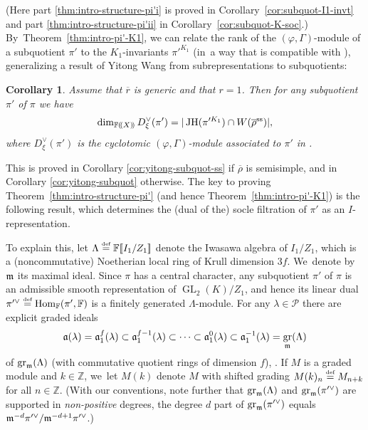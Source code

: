 \documentclass[JEP,XML,SOM,Unicode,NoFloatCountersInSection, NoEqCountersInSection,published]{cedram}
\newcommand{\defeq}{\stackrel{\textrm{\tiny{\upshape{def}}}}{=}}
\newcommand{\F}{\mathbb{F}}
\newcommand{\Z}{{\mathbb Z}}
\renewcommand{\P}{\mathscr P}
\renewcommand{\ss}{\mathrm{ss}}
\newcommand{\fa}{\mathfrak{a}}
\newcommand{\rbar}{\overline{r}}
\newcommand{\rhobar}{\overline{\rho}}
\newcommand{\brho}{\overline{\rho}}
\newcommand{\ppar}[1]{(\mkern-3mu(#1)\mkern-3mu)}
\newcommand{\bbra}[1]{[\mkern-3mu[#1]\mkern-3mu]}
\DeclareMathOperator{\GL}{GL}
\DeclareMathOperator{\gr}{gr}
\DeclareMathOperator{\Hom}{Hom}
\DeclareMathOperator{\JH}{\mathrm{JH}}
\theoremstyle{plain}
\newtheorem{cor}[prop]{Corollary}
\theoremstyle{definition}
\begin{document}
(Here part \eqref{thm:intro-structure-pi'i} is proved in Corollary~\ref{cor:subquot-I1-invt} and part \eqref{thm:intro-structure-pi'ii} in Corollary~\ref{cor:subquot-K-soc}.)
By~Theorem~\ref{thm:intro-pi'-K1}, we can relate the rank of the $(\varphi,\Gamma)$-module of a subquotient $\pi'$ to the $K_1$\nobreakdash-invariants $\pi'^{K_1}$ (in~a way that is compatible with \cite[\S2.4.3\ Ex.\,1, Conj.\,1.4]{BHHMS2}), generalizing a result of Yitong Wang \cite[Th.\,1.2]{YitongWang} from subrepresentations to subquotients:
\begin{cor}\label{thm:intro-yitong-subquot}
Assume that $\rbar$ is generic and that $r=1$.
Then for any subquotient $\pi'$ of $\pi$ we have
\begin{equation*}
\dim_{\F\ppar{X}} D_{\xi}^{\vee}(\pi')=|\JH(\pi'^{K_1}) \cap W(\rhobar^\ss)|,
\end{equation*}
where $D_\xi^\vee({\pi'})$ is the cyclotomic $(\varphi,\Gamma)$-module associated to ${\pi'}$ in \cite[\S 2.1.1]{BHHMS2}.
\end{cor}
This is proved in Corollary \ref{cor:yitong-subquot-ss} if $\brho$ is semisimple, and in Corollary \ref{cor:yitong-subquot} otherwise.
The key to proving Theorem~\ref{thm:intro-structure-pi'} (and hence Theorem~\ref{thm:intro-pi'-K1}) is the following result, which determines the (dual of the) socle filtration of $\pi'$ as an $I$-representation.

To explain this, let $\Lambda\defeq \F\bbra{I_1/Z_1}$ denote the Iwasawa algebra of $I_1/Z_1$, which is a (noncommutative) Noetherian local ring of Krull dimension $3f$. We~denote by $\mathfrak{m}$ its maximal ideal.
Since $\pi$ has a central character, any subquotient $\pi'$ of $\pi$ is an admissible smooth representation of $\GL_2(K)/Z_1$, and hence its linear dual $\pi'^\vee \defeq \Hom_\F(\pi',\F)$ is a finitely generated $\Lambda$-module.
For any $\lambda \in \P$ there are explicit graded ideals
\begin{equation*}
\fa(\lambda) = \fa_1^{f}(\lambda) \subset \fa_1^{f-1}(\lambda) \subset \cdots \subset \fa_1^{0}(\lambda) \subset \fa_1^{-1}(\lambda) = \gr_\m(\Lambda)
\end{equation*}
of $\gr_\m(\Lambda)$ (with commutative quotient rings of dimension $f$), \cf \cite[Eq.\,(77)]{BHHMS4}.
If $M$ is a graded module and $k\in\Z$, we~let $M(k)$ denote $M$ with shifted grading $M(k)_n\defeq M_{n+k}$ for all $n\in \Z$.
(With our conventions, note further that $\gr_\m(\Lambda)$ and $\gr_\m(\pi'^\vee)$ are supported in \emph{non-positive} degrees, \ie the degree $d$ part of $\gr_\m(\pi'^\vee)$ equals $\mathfrak{m}^{-d} \pi'^\vee/\mathfrak{m}^{-d+1}\pi'^\vee$.)
\end{document}
